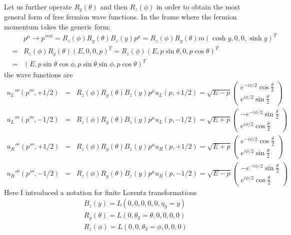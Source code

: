 \documentclass[12pt]{article}
\begin{document}
  Let us further operate $R_y(\theta)$ and then $R_z(\phi)$ in order to obtain
  the most general form of free fermion wave functions.  In the frame
  where the fermion momentum takes the generic form:
\begin{eqnarray}
  &&p^\mu \to p{'''}^\mu
             = R_z(\phi) R_y(\theta) B_z(y) p^\mu
             = R_z(\phi) R_y(\theta) m ( \cosh y, 0, 0, \sinh y )^T \\ 
             &=& R_z(\phi) R_y(\theta) ( E, 0, 0, p )^T
             = R_z(\phi) ( E, p\sin\theta, 0, p\cos\theta )^T \\
             &=& ( E, p\sin\theta\cos\phi, p\sin\theta\sin\phi, p\cos\theta )^T\label{eq.14_44}
\end{eqnarray}
  the wave functions are
\begin{eqnarray}
  u_L{'''}(p{'''},+1/2) &=& R_z(\phi)R_y(\theta)B_z(y) p^\mu u_L(p,+1/2)
  =\sqrt{E-p}
  \begin{pmatrix}
    e^{-i\phi/2} \cos\frac{\theta}{2} \\
    e^{i\phi/2}  \sin\frac{\theta}{2}
  \end{pmatrix} \label{eq.14_45a} \\
  u_L{'''}(p{'''},-1/2) &=& R_z(\phi)R_y(\theta)B_z(y) p^\mu u_L(p,-1/2)
  =\sqrt{E+p}
  \begin{pmatrix}
    -e^{-i\phi/2} \sin\frac{\theta}{2} \\
    e^{i\phi/2}  \cos\frac{\theta}{2}
  \end{pmatrix} \label{eq.14_45b} \\
  u_R{'''}(p{'''},+1/2) &=& R_z(\phi)R_y(\theta)B_z(y) p^\mu u_R(p,+1/2)
  = \sqrt{E+p}
  \begin{pmatrix}
    e^{-i\phi/2} \cos\frac{\theta}{2} \\
    e^{i\phi/2}  \sin\frac{\theta}{2}
  \end{pmatrix} \label{eq.14_45c} \\
  u_R{'''}(p{'''},-1/2) &=& R_z(\phi)R_y(\theta)B_z(y) p^\mu u_R(p,-1/2)
  = \sqrt{E-p}
  \begin{pmatrix}
    -e^{-i\phi/2} \sin\frac{\theta}{2} \\
    e^{i\phi/2}  \cos\frac{\theta}{2}
  \end{pmatrix} \label{eq.14_45d}
 \end{eqnarray}
Here I introduced a notation for finite Lorentz transformations
\begin{eqnarray}
  &&B_z(y)      = L(0,0,0,0,0,\eta_3=y)  \label{eq.14_46a} \\
  && R_y(\theta) = L(0,\theta_2=\theta,0,0,0,0)\label{eq.14_46b} \\
  && R_z(\phi)   = L(0,0,\theta_3=\phi,0,0,0)\label{eq.14_46c}
\end{eqnarray}
\end{document}
